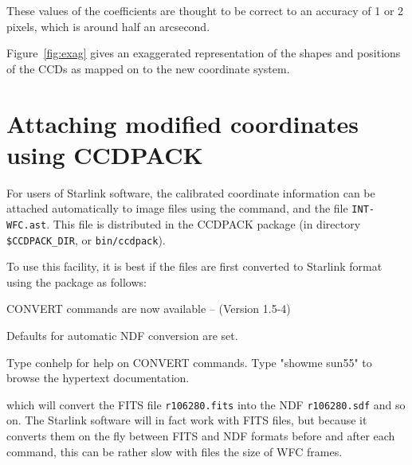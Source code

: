 \documentclass[twoside,11pt]{starlink}
\begin{document}
These values of the coefficients are thought to be correct to an
accuracy of 1 or 2 pixels, which is around half an arcsecond.

Figure~\ref{fig:exag} gives an exaggerated representation of the
shapes and positions of the CCDs as mapped on to the new coordinate system.


\latexhtml{\newpage}{\htmlrule}
\section{Attaching modified coordinates using CCDPACK}

For users of Starlink software,
the calibrated coordinate information can be attached automatically
to image files using the
command, and the file \texttt{INT-WFC.ast}.
This file is distributed in the CCDPACK package
(in directory \texttt{\$CCDPACK\_DIR}, or \texttt{bin/ccdpack}).

To use this facility,
it is best if the files are first converted to Starlink 
format using the  package as follows:
\begin{terminalv}

   CONVERT commands are now available -- (Version 1.5-4)

   Defaults for automatic NDF conversion are set.

   Type conhelp for help on CONVERT commands.
   Type "showme sun55" to browse the hypertext documentation.

\end{terminalv}
which will convert the FITS file \texttt{r106280.fits}
into the NDF \texttt{r106280.sdf} and so on.
The Starlink software will in fact work with FITS files,
but because it converts them on the fly between FITS and NDF formats
before and after each command,
this can be rather slow with files the size of WFC frames.
\end{document}
